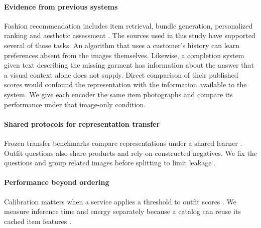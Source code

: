 \paragraph{Evidence from previous systems}
Fashion recommendation includes item retrieval, bundle generation, personalized ranking and aesthetic assessment \cite{deldjoo2024review,ding2024fashion}. The sources used in this study have supported several of those tasks. An algorithm that uses a customer's history can learn preferences absent from the images themselves. Likewise, a completion system given text describing the missing garment has information about the answer that a visual context alone does not supply. Direct comparison of their published scores would confound the representation with the information available to the system. We give each encoder the same item photographs and compare its performance under that image-only condition.

\paragraph{Shared protocols for representation transfer}
Frozen transfer benchmarks compare representations under a shared learner \cite{kornblith2019transfer,ericsson2021transfer,battle,li2022elevater}. Outfit questions also share products and rely on constructed negatives. We fix the questions and group related images before splitting to limit leakage \cite{kaufman2011leakage,kapoor2023leakage}.

\paragraph{Performance beyond ordering}
Calibration matters when a service applies a threshold to outfit scores \cite{guo2017calibration,vaicenavicius2019calibration}. We measure inference time and energy separately because a catalog can reuse its cached item features \cite{henderson2020reporting,schwartz2020green}.
